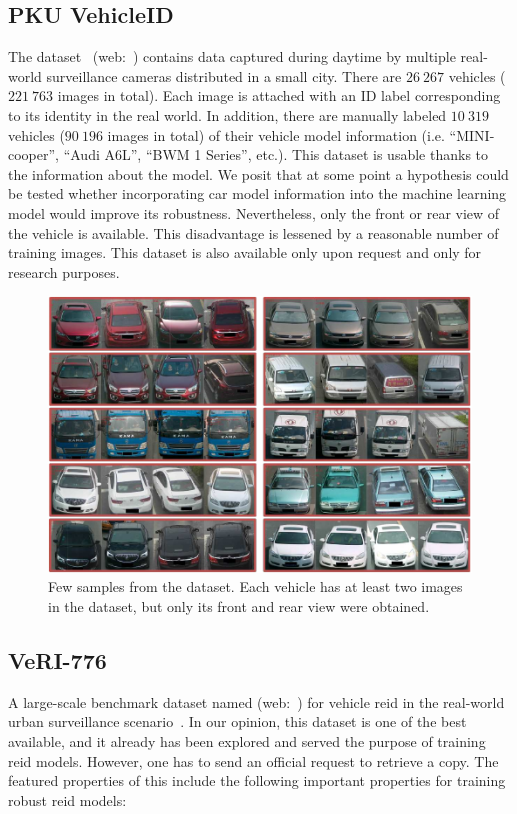 \subsection{PKU VehicleID}
\label{ssec:DatasetPKUVehicleID}

The  dataset~\cite{liu2016deep} (web:~\cite{pkuvehicleiddataset}) contains data captured during daytime by multiple real-world surveillance cameras distributed in a small city. There are $26\ 267$ vehicles ($221\ 763$ images in total). Each image is attached with an ID label corresponding to its identity in the real world. In addition, there are manually labeled $10\ 319$ vehicles ($90\ 196$ images in total) of their vehicle model information (i.e. “MINI-cooper”, “Audi A6L”, “BWM 1 Series”, etc.). This dataset is usable thanks to the information about the model. We posit that at some point a hypothesis could be tested whether incorporating car model information into the machine learning model would improve its robustness. Nevertheless, only the front or rear view of the vehicle is available. This disadvantage is lessened by a reasonable number of training images. This dataset is also available only upon request and only for research purposes.

\begin{figure}[t]
    \centerline{\includegraphics[width=0.5\linewidth]{figures/datasets/vehicleid_overview.pdf}}
    \caption[ dataset]{Few samples from the  dataset. Each vehicle has at least two images in the dataset, but only its front and rear view were obtained. }
    \label{fig:DatasetVehicleID}
\end{figure}

\subsection{VeRI-776}
\label{ssec:DatasetVeRI776}

A large-scale benchmark dataset named  (web:~\cite{veridataset}) for vehicle \gls{reid} in the real-world urban surveillance scenario~\cite{Liu2018}. In our opinion, this dataset is one of the best available, and it already has been explored and served the purpose of training \gls{reid} models. However, one has to send an official request to retrieve a copy. The featured properties of this include the following important properties for training robust \gls{reid} models:

